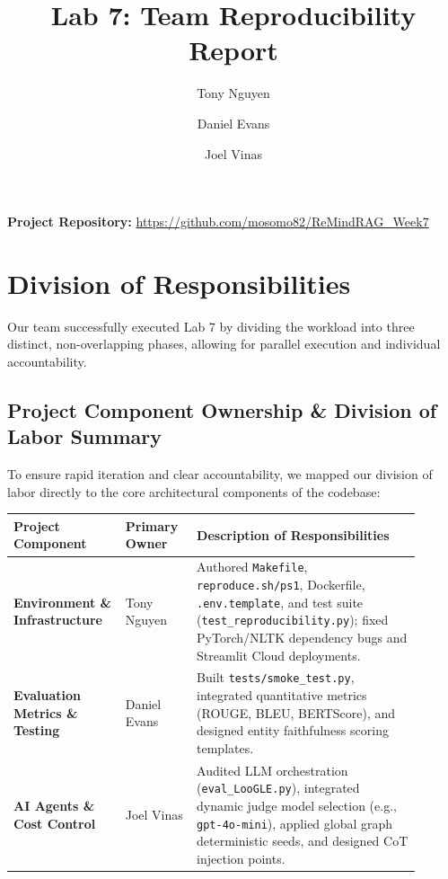 \documentclass[11pt, letterpaper]{article}
\title{\vspace{-2em}Lab 7: Team Reproducibility Report}
\author{Tony Nguyen \and Daniel Evans \and Joel Vinas}
\date{}
\begin{document}
\maketitle
\vspace{-3em}

\begin{center}
\textbf{Project Repository:} \url{https://github.com/mosomo82/ReMindRAG_Week7}
\end{center}

\section*{Division of Responsibilities}
Our team successfully executed Lab 7 by dividing the workload into three distinct, non-overlapping phases, allowing for parallel execution and individual accountability.

\subsection*{Project Component Ownership \& Division of Labor Summary}
To ensure rapid iteration and clear accountability, we mapped our division of labor directly to the core architectural components of the codebase:

\vspace{1em}
\noindent\begin{tabular}{|p{0.25\linewidth}|p{0.15\linewidth}|p{0.5\linewidth}|}
\hline
\textbf{Project Component} & \textbf{Primary Owner} & \textbf{Description of Responsibilities} \\
\hline
\textbf{Environment \& Infrastructure} & Tony Nguyen & Authored \texttt{Makefile}, \texttt{reproduce.sh/ps1}, Dockerfile, \texttt{.env.template}, and test suite (\texttt{test\_reproducibility.py}); fixed PyTorch/NLTK dependency bugs and Streamlit Cloud deployments. \\
\hline
\textbf{Evaluation Metrics \& Testing} & Daniel Evans & Built \texttt{tests/smoke\_test.py}, integrated quantitative metrics (ROUGE, BLEU, BERTScore), and designed entity faithfulness scoring templates. \\
\hline
\textbf{AI Agents \& Cost Control} & Joel Vinas & Audited LLM orchestration (\texttt{eval\_LooGLE.py}), integrated dynamic judge model selection (e.g., \texttt{gpt-4o-mini}), applied global graph deterministic seeds, and designed CoT injection points. \\
\hline
\end{tabular}
\vspace{1em}
\end{document}
